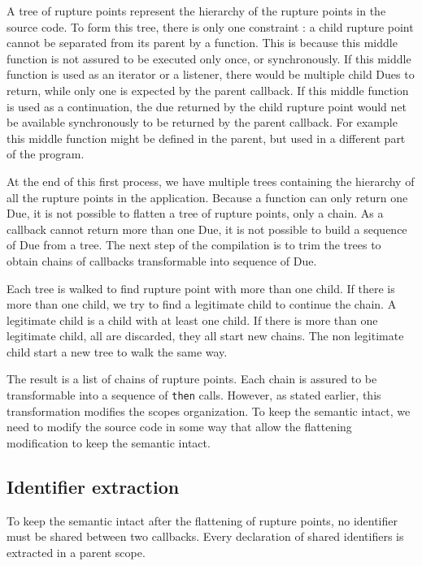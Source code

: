 A tree of rupture points represent the hierarchy of the rupture points in the source code.
To form this tree, there is only one constraint : a child rupture point cannot be separated from its parent by a function.
This is because this middle function is not assured to be executed only once, or synchronously.
If this middle function is used as an iterator or a listener, there would be multiple child Dues to return, while only one is expected by the parent callback.
If this middle function is used as a continuation, the due returned by the child rupture point would net be available synchronously to be returned by the parent callback.
For example this middle function might be defined in the parent, but used in a different part of the program.

At the end of this first process, we have multiple trees containing the hierarchy of all the rupture points in the application.
Because a function can only return one Due, it is not possible to flatten a tree of rupture points, only a chain.
As a callback cannot return more than one Due, it is not possible to build a sequence of Due from a tree.
The next step of the compilation is to trim the trees to obtain chains of callbacks transformable into sequence of Due.

Each tree is walked to find rupture point with more than one child.
If there is more than one child, we try to find a legitimate child to continue the chain.
A legitimate child is a child with at least one child.
If there is more than one legitimate child, all are discarded, they all start new chains.
The non legitimate child start a new tree to walk the same way.

The result is a list of chains of rupture points.
Each chain is assured to be transformable into a sequence of \texttt{then} calls.
However, as stated earlier, this transformation modifies the scopes organization.
To keep the semantic intact, we need to modify the source code in some way that allow the flattening modification to keep the semantic intact.


\subsection{Identifier extraction} \label{section:compiler:extraction}

To keep the semantic intact after the flattening of rupture points, no identifier must be shared between two callbacks.
Every declaration of shared identifiers is extracted in a parent scope.

